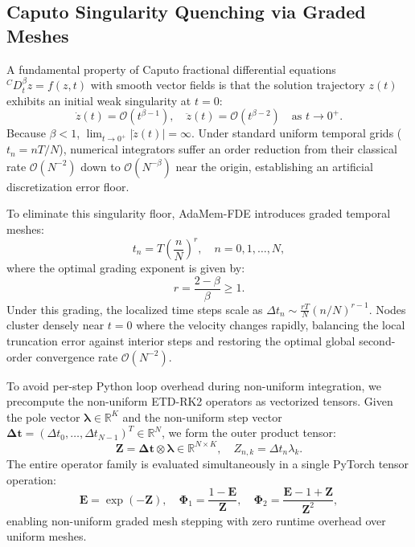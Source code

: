 \documentclass[11pt,a4paper]{article}
\theoremstyle{plain}
\theoremstyle{definition}
\newcommand{\R}{\mathbb{R}}
\newcommand{\cD}{{}^C D}
\newcommand{\dt}{\Delta t}
\begin{document}
\subsection{Caputo Singularity Quenching via Graded Meshes}
\label{subsec:graded_meshes}
A fundamental property of Caputo fractional differential equations $\cD_t^\beta z = f(z, t)$ with smooth vector fields is that the solution trajectory $z(t)$ exhibits an initial weak singularity at $t = 0$:
\begin{equation}
    \dot{z}(t) = \mathcal{O}(t^{\beta - 1}), \quad \ddot{z}(t) = \mathcal{O}(t^{\beta - 2}) \quad \text{as } t \to 0^+.
    \label{eq:weak_singularity}
\end{equation}
Because $\beta < 1$, $\lim_{t \to 0^+} |\dot{z}(t)| = \infty$. Under standard uniform temporal grids ($t_n = n T / N$), numerical integrators suffer an order reduction from their classical rate $\mathcal{O}(N^{-2})$ down to $\mathcal{O}(N^{-\beta})$ near the origin, establishing an artificial discretization error floor.

To eliminate this singularity floor, AdaMem-FDE introduces graded temporal meshes:
\begin{equation}
    t_n = T \left( \frac{n}{N} \right)^r, \quad n = 0, 1, \dots, N,
    \label{eq:graded_mesh_formula}
\end{equation}
where the optimal grading exponent is given by:
\begin{equation}
    r = \frac{2 - \beta}{\beta} \ge 1.
    \label{eq:optimal_grading_exponent}
\end{equation}
Under this grading, the localized time steps scale as $\dt_n \sim \frac{r T}{N} (n/N)^{r-1}$. Nodes cluster densely near $t = 0$ where the velocity changes rapidly, balancing the local truncation error against interior steps and restoring the optimal global second-order convergence rate $\mathcal{O}(N^{-2})$.

To avoid per-step Python loop overhead during non-uniform integration, we precompute the non-uniform ETD-RK2 operators as vectorized tensors. Given the pole vector $\bm{\lambda} \in \R^K$ and the non-uniform step vector $\bm{\Delta t} = (\dt_0, \dots, \dt_{N-1})^T \in \R^N$, we form the outer product tensor:
\begin{equation}
    \mathbf{Z} = \bm{\Delta t} \otimes \bm{\lambda} \in \R^{N \times K}, \quad Z_{n, k} = \dt_n \lambda_k.
\end{equation}
The entire operator family is evaluated simultaneously in a single PyTorch tensor operation:
\begin{equation}
    \mathbf{E} = \exp(-\mathbf{Z}), \quad \mathbf{\Phi}_1 = \frac{1 - \mathbf{E}}{\mathbf{Z}}, \quad \mathbf{\Phi}_2 = \frac{\mathbf{E} - 1 + \mathbf{Z}}{\mathbf{Z}^2},
    \label{eq:vectorized_etd_tensors}
\end{equation}
enabling non-uniform graded mesh stepping with zero runtime overhead over uniform meshes.
\end{document}
